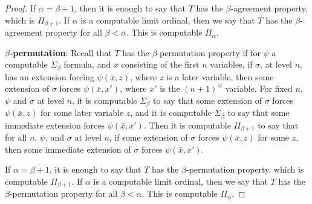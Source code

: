 \documentclass[10pt,a4paper]{amsart}
\begin{document}
\begin{proof}
\bigskip
\noindent
 If $\alpha = \beta+1$, then it is enough to say that $T$ has the $\beta$-agreement property, which is $\Pi_{\beta+1}$.  If $\alpha$ is a computable limit ordinal, then we say that $T$ has the $\beta$-agreement property for all $\beta < \alpha$.  This is computable $\Pi_\alpha$.

\bigskip
\noindent
\textbf{$\beta$-permutation}:  Recall that $T$ has the $\beta$-permutation property if for $\psi$ a computable $\Sigma_\beta$ formula, and $\bar{x}$ consisting of the first $n$ variables, if $\sigma$, at level $n$, has an extension forcing $\psi(\bar{x},z)$, where $z$ is a later variable, then some extension of $\sigma$ forces $\psi(\bar{x},x')$, where  $x'$ is the $(n+1)^{st}$ variable.  For fixed $n$, $\psi$ and $\sigma$ at level $n$, it is computable $\Sigma_\beta$ to say that some extension of $\sigma$ forces $\psi(\bar{x},z)$ for some later variable $z$, and it is computable $\Sigma_\beta$ to say that some immediate extension forces $\psi(\bar{x},x')$.  Then it is computable $\Pi_{\beta+1}$ to say that for all $n$, $\psi$, and $\sigma$ at level $n$, if some extension of $\sigma$ forces $\psi(\bar{x},z)$ for some $z$, then some immediate extension of $\sigma$ forces $\psi(\bar{x},x')$.

\bigskip
\noindent
 If $\alpha = \beta+1$, it is enough to say that $T$ has the $\beta$-permutation property, which is computable $\Pi_{\beta+1}$.  If $\alpha$ is a computable limit ordinal, then we say that $T$ has the $\beta$-permutation property for all $\beta < \alpha$.  This is computable $\Pi_\alpha$.          
\end{proof}
\end{document}
